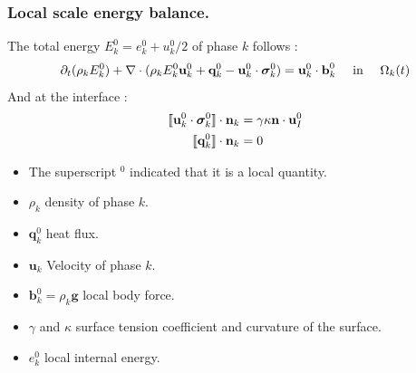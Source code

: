 \documentclass{sintefbeamer}
\begin{document}
  \begin{frame}
    \frametitle{Local scale energy balance.}
    The total energy $E_k^0 = e_k^0 + u^0_k /2$ of phase $k$ follows :
  \begin{equation}
    \pddt (\rho_kE_k^0)  
    + \div (
        \rho_kE_k^0\textbf{u}_k^0
        + \textbf{q}_k^0
        - \textbf{u}_k^0 \cdot \bm{\sigma}_k^0 
        )
    = 
    \textbf{u}_k^0 \cdot \textbf{b}_k^0
    \ \ \ \ 
    \text{in} 
    \ \ \ \ 
    \Omega_k(t)
  \end{equation}
  And at the interface : 
  \begin{align}
    \label{eq:dt_rhoI_uI2}
    \llbracket \textbf{u}_k^0 \cdot \bm{\sigma}_k^0 \rrbracket \cdot \textbf{n}_k
    &= 
     \gamma\kappa\textbf{n}\cdot \textbf{u}_{I}^0\\
    \label{eq:dt_rhoIe_I}
    \llbracket  \textbf{q}_k^0 \rrbracket \cdot \textbf{n}_k
    &= 
     0
\end{align}
    \begin{itemize}
      \item The superscript $^0$ indicated that it is a local quantity.
      \item $\rho_k$  density of phase $k$. 
      \item $\textbf{q}_k^0$  heat flux.
      \item $\textbf{u}_k$  Velocity of phase $k$.
      \item $\textbf{b}_k^0 = \rho_k \textbf{g}$  local body force.  
      \item $\gamma$ and $\kappa$  surface tension coefficient and curvature of the surface.  
      \item $e_k^0$  local internal energy. 
    \end{itemize}
  
  \end{frame}
\end{document}
